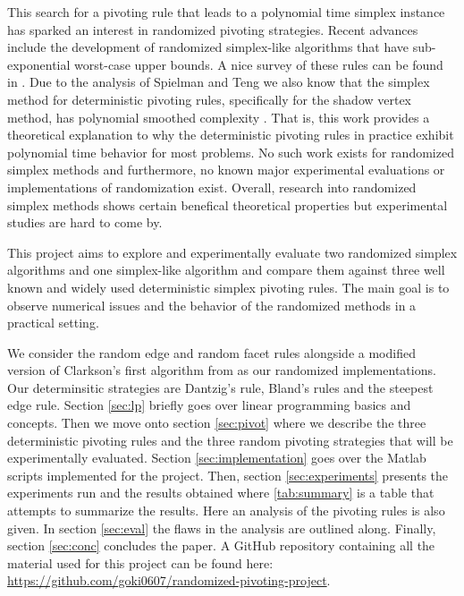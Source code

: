 \documentclass{standalone}
\begin{document}
This search for a pivoting rule that leads to a polynomial time simplex instance has sparked an interest in randomized pivoting strategies. Recent advances include the development of randomized simplex-like algorithms that have sub-exponential worst-case upper bounds. A nice survey of these rules can be found in \cite{goldwasser1995survey}. Due to the analysis of Spielman and Teng we also know that the simplex method for deterministic pivoting rules, specifically for the shadow vertex method, has polynomial smoothed complexity \cite{spielman2004smoothed}. That is, this work provides a theoretical explanation to why the deterministic pivoting rules in practice exhibit polynomial time behavior for most problems. No such work exists for randomized simplex methods and furthermore, no known major experimental evaluations or implementations of randomization exist. Overall, research into randomized simplex methods shows certain benefical theoretical properties but experimental studies are hard to come by.\par
This project aims to explore and experimentally evaluate two randomized simplex algorithms and one simplex-like algorithm and compare them against three well known and widely used deterministic simplex pivoting rules. The main goal is to observe numerical issues and the behavior of the randomized methods in a practical setting.\par
We consider the random edge and random facet rules alongside a modified version of Clarkson's first algorithm from \cite{clarkson1995vegas} as our randomized implementations. Our determinsitic strategies are Dantzig's rule, Bland's rules and the steepest edge rule. Section \ref{sec:lp} briefly goes over linear programming basics and concepts. Then we move onto section \ref{sec:pivot} where we describe the three deterministic pivoting rules and the three random pivoting strategies that will be experimentally evaluated. Section \ref{sec:implementation} goes over the Matlab scripts implemented for the project. Then, section \ref{sec:experiments} presents the experiments run and the results obtained where \ref{tab:summary} is a table that attempts to summarize the results. Here an analysis of the pivoting rules is also given. In section \ref{sec:eval} the flaws in the analysis are outlined along. Finally, section \ref{sec:conc} concludes the paper. A GitHub repository containing all the material used for this project can be found here: \url{https://github.com/goki0607/randomized-pivoting-project}.
\end{document}
